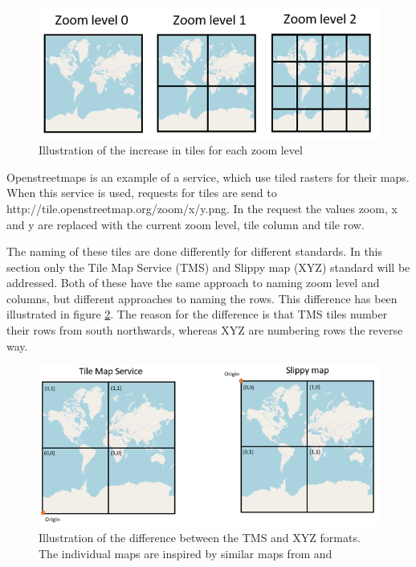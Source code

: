 \begin{figure} [H]
	\centering
	\includegraphics[width=1\textwidth]{Pictures/TilesPerZoomLevel}
	\caption{Illustration of the increase in tiles for each zoom level}
	\label{TilesPerZoomLevel}
\end{figure}

Openstreetmaps is an example of a service, which use tiled rasters for their maps. When this service is used, requests for tiles are send to 
http://tile.openstreetmap.org/zoom/x/y.png.
In the request the values zoom, x and y are replaced with the current zoom level, tile column and tile row.
\citep{SlippyMap}


The naming of these tiles are done differently for different standards. In this section only the Tile Map Service (TMS) and Slippy map (XYZ) standard will be addressed. Both of these have the same approach to naming zoom level and columns, but different approaches to naming the rows. This difference has been illustrated in figure \ref{TMSXYZ}. The reason for the difference is that TMS tiles number their rows from south northwards, whereas XYZ are numbering rows the reverse way. %
\citep{TMS}

\begin{figure} [H]
	\centering
	\includegraphics[width=.8\textwidth]{Pictures/TMSXYZ}
	\caption{Illustration of the difference between the TMS and XYZ formats. The individual maps are inspired by similar maps from \citet{Slippy101} and \citet{TMSnaming}}
	\label{TMSXYZ}
\end{figure}

%
